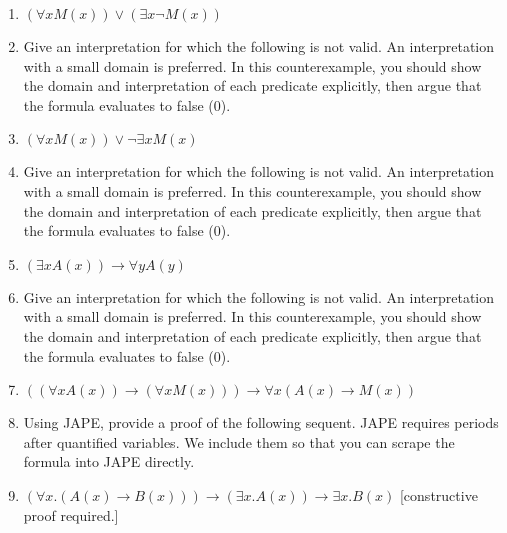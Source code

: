 \documentclass{cs81-homework}
\begin{document}
\begin{enumerate}
\item {} \((\forall x M(x)) \lor (\exists x \lnot M(x))\)

  \begin{solution}
  \end{solution}

\item[] Give an interpretation for which the following is not valid. An
  interpretation with a small domain is preferred. In this counterexample, you
  should show the domain and interpretation of each predicate explicitly, then
  argue that the formula evaluates to false (0).
  
\item {} \((\forall x M(x)) \lor \lnot \exists x M(x)\)

  \begin{solution}
  \end{solution}

\item[] Give an interpretation for which the following is not valid. An
  interpretation with a small domain is preferred. In this counterexample, you
  should show the domain and interpretation of each predicate explicitly, then
  argue that the formula evaluates to false (0).
  
\item {} \((\exists x A(x)) \to  \forall y A(y)\)

  \begin{solution}
  \end{solution}

\item[] Give an interpretation for which the following is not valid. An
  interpretation with a small domain is preferred. In this counterexample, you
  should show the domain and interpretation of each predicate explicitly, then
  argue that the formula evaluates to false (0).

\item {} \(((\forall x A(x)) \to  (\forall x M(x))) \to  \forall x (A(x) \to  M(x))\)

  \begin{solution}
  \end{solution}

\item[] Using JAPE, provide a proof of the following sequent. JAPE requires
  periods after quantified variables. We include them so that you can scrape the
  formula into JAPE directly.
\item {}
  \((\forall x.(A(x) \to B(x))) \to (\exists x.A(x))\to \exists x.B(x)\)
  [constructive proof required.]


\end{enumerate}
\end{document}
